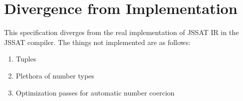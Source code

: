 \documentclass[twocolumn]{article}
\begin{document}
\section{Divergence from Implementation}

This specification diverges from the real implementation of JSSAT IR in the JSSAT
compiler. The things not implemented are as follows:

\begin{enumerate}
  \item Tuples
  \item Plethora of number types
  \item Optimization passes for automatic number coercion
\end{enumerate}



\end{document}

